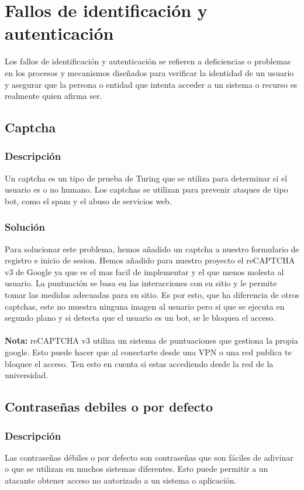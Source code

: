 \documentclass{report}
\begin{document}
        \section{Fallos de identificación y autenticación}
            Los fallos de identificación y autenticación se refieren a deficiencias o problemas en los procesos y mecanismos diseñados para verificar la identidad de un usuario y asegurar que la persona o entidad que intenta acceder a un sistema o recurso es realmente quien afirma ser. 
            \subsection{Captcha}
                \subsubsection{Descripción}
                    Un captcha es un tipo de prueba de Turing que se utiliza para determinar si el usuario es o no humano. Los captchas se utilizan para prevenir ataques de tipo bot, como el spam y el abuso de servicios web.
                \subsubsection{Solución}
                    Para solucionar este problema, hemos añadido un captcha a nuestro formulario de registro e inicio de sesion.
                    Hemos añadido para nuestro proyecto el reCAPTCHA v3 de Google ya que es el mas facil de implementar y el que menos molesta al usuario.
                    La puntuación se basa en las interacciones con su sitio y le permite tomar las medidas adecuadas para su sitio.
                    Es por esto, que ha diferencia de otros captchas, este no muestra ninguna imagen al usuario pero si que se ejecuta en segundo plano y si detecta que el usuario es un bot, se le bloquea el acceso.
                    \\\\
                    \textbf{Nota:} reCAPTCHA v3 utiliza un sistema de puntuaciones que gestiona la propia google. Esto puede hacer que al conectarte desde una VPN o una red publica te bloquee el acceso. Ten esto en cuenta si estas accediendo desde la red de la universidad.
            \clearpage
            \subsection{Contraseñas debiles o por defecto}
                \subsubsection{Descripción}
                    Las contraseñas débiles o por defecto son contraseñas que son fáciles de adivinar o que se utilizan en muchos sistemas diferentes. Esto puede permitir a un atacante obtener acceso no autorizado a un sistema o aplicación.
\end{document}
